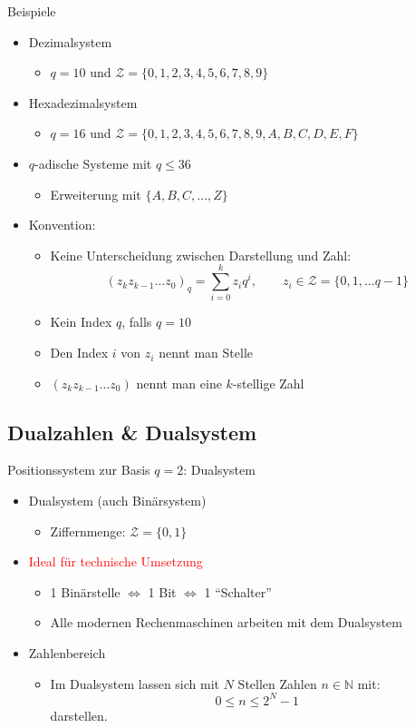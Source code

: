 \documentclass[12pt%
,aspectratio=169%
]{beamer}
\begin{document}
\begin{frame}{Beispiele}
\begin{itemize}
	\item Dezimalsystem
	\begin{itemize}
		\item $q = 10$ und $\mathcal{Z} = \{0, 1, 2, 3, 4, 5, 6, 7, 8, 9\}$
	\end{itemize}
	\item Hexadezimalsystem	
	\begin{itemize}
		\item $q = 16$ und $\mathcal{Z} = \{0, 1, 2, 3, 4, 5, 6, 7, 8, 9, A, B, C, D, E, F \}$
	\end{itemize}
	\item $q$-adische Systeme mit $q \leq 36$
	\begin{itemize}
		\item Erweiterung mit $\{A, B, C, . . . , Z\}$
	\end{itemize}
	\item Konvention:
	\begin{itemize}
		\item Keine Unterscheidung zwischen Darstellung und Zahl:
		$$
			(z_{k}z_{k-1} \ldots z_0)_q = \sum_{i=0}^k z_i q^i , \qquad z_i \in \mathcal{Z} = \{0,1, \ldots q-1 \}
		$$
		\item Kein Index $q$, falls $q = 10$
		\item Den Index $i$ von $z_i$ nennt man Stelle
		\item $(z_{k}z_{k-1} \ldots z_0)$ nennt man eine $k$-stellige Zahl
	\end{itemize}
\end{itemize}
\end{frame}

\subsection{Dualzahlen \& Dualsystem}
\begin{frame}{Positionssystem zur Basis $q = 2$: Dualsystem}
\begin{itemize}
	\item Dualsystem (auch Binärsystem)
	\begin{itemize}
		\item Ziffernmenge: $\mathcal{Z} = \{0, 1\}$
	\end{itemize}
	\item \textcolor{red}{Ideal für technische Umsetzung}
	\begin{itemize}
		\item 1 Binärstelle $\Leftrightarrow$ 1 Bit $\Leftrightarrow$ 1 \enquote{Schalter}
		\item Alle modernen Rechenmaschinen arbeiten mit dem Dualsystem
	\end{itemize}
	\item Zahlenbereich
	\begin{itemize}
		\item Im Dualsystem lassen sich mit $N$ Stellen Zahlen $n \in \mathbb{N}$ mit:
		$$
			0 \leq n \leq 2^{N} - 1
		$$
		darstellen.
	\end{itemize}
\end{itemize}
\end{frame}
\end{document}
